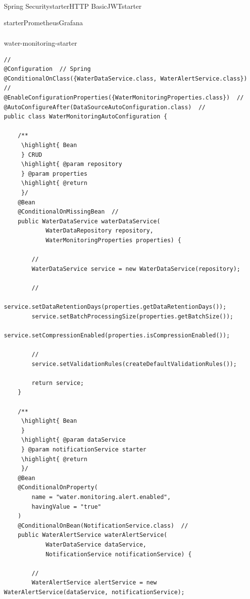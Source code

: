 Spring SecuritystarterHTTP
BasicJWTstarter

starterPrometheusGrafana

\hypertarget{section-33}{%
\subsubsection{}\label{section-33}}

water-monitoring-starter

\begin{lstlisting}[style=java]
// 
@Configuration  // Spring
@ConditionalOnClass({WaterDataService.class, WaterAlertService.class})  // 
@EnableConfigurationProperties({WaterMonitoringProperties.class})  // 
@AutoConfigureAfter(DataSourceAutoConfiguration.class)  // 
public class WaterMonitoringAutoConfiguration {
    
    /**
     \highlight{ Bean
     } CRUD
     \highlight{ @param repository 
     } @param properties 
     \highlight{ @return 
     }/
    @Bean
    @ConditionalOnMissingBean  // 
    public WaterDataService waterDataService(
            WaterDataRepository repository,
            WaterMonitoringProperties properties) {
        
        // 
        WaterDataService service = new WaterDataService(repository);
        
        // 
        service.setDataRetentionDays(properties.getDataRetentionDays());
        service.setBatchProcessingSize(properties.getBatchSize());
        service.setCompressionEnabled(properties.isCompressionEnabled());
        
        // 
        service.setValidationRules(createDefaultValidationRules());
        
        return service;
    }
    
    /**
     \highlight{ Bean
     } 
     \highlight{ @param dataService 
     } @param notificationService starter
     \highlight{ @return 
     }/
    @Bean
    @ConditionalOnProperty(
        name = "water.monitoring.alert.enabled", 
        havingValue = "true"
    )
    @ConditionalOnBean(NotificationService.class)  // 
    public WaterAlertService waterAlertService(
            WaterDataService dataService,
            NotificationService notificationService) {
        
        // 
        WaterAlertService alertService = new WaterAlertService(dataService, notificationService);
        

\end{lstlisting}
